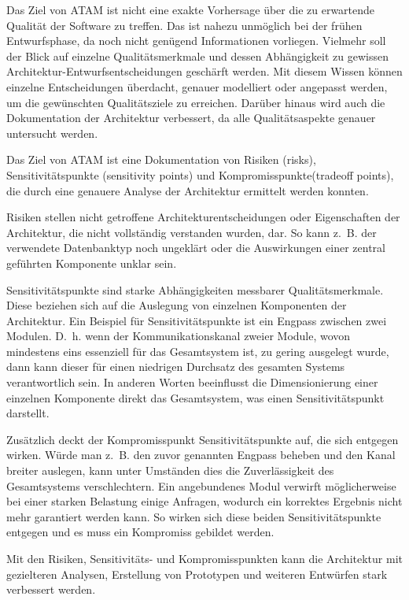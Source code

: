 Das Ziel von \ac{ATAM} ist nicht eine exakte Vorhersage über die 
zu erwartende Qualität der Software zu treffen. Das ist nahezu unmöglich bei der frühen Entwurfsphase, da noch nicht genügend Informationen 
vorliegen. Vielmehr soll der Blick auf einzelne Qualitätsmerkmale und dessen Abhängigkeit zu gewissen Architektur-Entwurfsentscheidungen geschärft 
werden\cite{Clements2000}. Mit diesem Wissen können einzelne Entscheidungen überdacht, genauer modelliert oder angepasst werden, um die gewünschten 
Qualitätsziele zu erreichen. Darüber hinaus wird auch die Dokumentation der Architektur verbessert, da alle Qualitätsaspekte genauer untersucht werden.

Das Ziel von \ac{ATAM} ist eine Dokumentation von Risiken (risks), Sensitivitätspunkte (sensitivity points) und Kompromisspunkte(tradeoff points), die durch eine genauere Analyse der Architektur\cite{Clements2000} ermittelt werden konnten.

Risiken stellen nicht getroffene Architekturentscheidungen oder Eigenschaften der Architektur, die nicht vollständig
verstanden wurden, dar. So kann z.~B. der verwendete Datenbanktyp noch ungeklärt oder die Auswirkungen einer zentral geführten Komponente unklar sein.

Sensitivitätspunkte sind starke Abhängigkeiten messbarer Qualitätsmerkmale. Diese beziehen sich auf die Auslegung von einzelnen Komponenten der Architektur. Ein Beispiel für Sensitivitätspunkte ist ein Engpass zwischen zwei Modulen. D.~h. wenn der Kommunikationskanal zweier Module, wovon mindestens eins essenziell für das Gesamtsystem ist, zu gering ausgelegt wurde, dann kann dieser für einen niedrigen Durchsatz des gesamten Systems verantwortlich sein. In anderen Worten beeinflusst die Dimensionierung einer einzelnen Komponente direkt das Gesamtsystem, was einen Sensitivitätspunkt darstellt.

Zusätzlich deckt der Kompromisspunkt Sensitivitätspunkte auf, die sich entgegen wirken.
Würde man z.~B. den zuvor genannten Engpass beheben und den Kanal breiter auslegen, kann unter Umständen dies die Zuverlässigkeit des Gesamtsystems verschlechtern. Ein angebundenes Modul verwirft möglicherweise bei einer starken Belastung einige Anfragen, wodurch ein korrektes Ergebnis nicht mehr garantiert werden kann. So wirken sich diese beiden Sensitivitätspunkte entgegen und es muss ein Kompromiss gebildet werden.  
 
Mit den Risiken, Sensitivitäts- und Kompromisspunkten kann die Architektur mit gezielteren Analysen, Erstellung von Prototypen und weiteren Entwürfen stark verbessert 
werden. 

